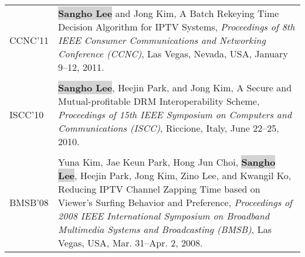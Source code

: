 \documentclass[letterpaper]{article}
\def\name{Sangho Lee}
\newcommand{\myname}{\colorbox{lightgray}{\textbf{\name}}\xspace}
\begin{document}
\begin{longtable}{@{}p{0.8in}p{5.4in}@{}}
  CCNC'11 & \myname and Jong Kim, A Batch Rekeying Time Decision Algorithm for IPTV Systems, {\it Proceedings of 8th IEEE Consumer Communications and Networking Conference (CCNC)}, Las Vegas, Nevada, USA, January 9--12, 2011.\\\\
  ISCC'10 & \myname, Heejin Park, and Jong Kim, A Secure and Mutual-profitable DRM Interoperability Scheme, {\it Proceedings of 15th IEEE Symposium on Computers and Communications (ISCC)}, Riccione, Italy, June 22--25, 2010.\\\\
  BMSB'08 & Yuna Kim, Jae Keun Park, Hong Jun Choi, \myname, Heejin Park, Jong Kim, Zino Lee, and Kwangil Ko, Reducing IPTV Channel Zapping Time based on Viewer's Surfing Behavior and Preference, {\it Proceedings of 2008 IEEE International Symposium on Broadband Multimedia Systems and Broadcasting (BMSB)}, Las Vegas, USA, Mar. 31--Apr. 2, 2008.
\end{longtable}
\end{document}
